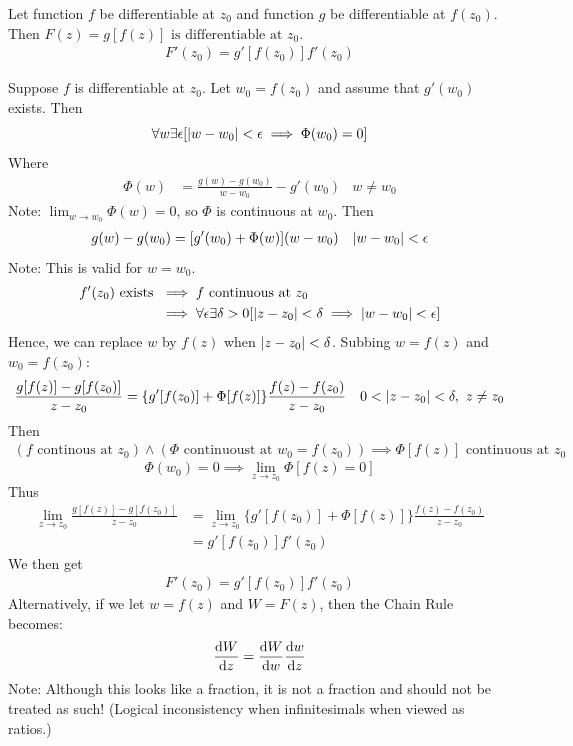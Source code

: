 \documentclass[12pt, english]{book}
\makeatletter
\renewenvironment{proof}[1][\proofname]{\par
	\pushQED{\qed}%
	\normalfont \topsep6\p@\@plus6\p@\relax
	\list{}{%
		\settowidth{\leftmargin}{\itshape\proofname:\hskip\labelsep}%
		\setlength{\labelwidth}{0pt}%
		\setlength{\itemindent}{-\leftmargin}%
	}%
	\item[\hskip\labelsep\itshape#1\@addpunct{:}]\ignorespaces
	}{ \popQED\endlist\@endpefalse}
\makeatother
\begin{document}
	\begin{theorem} 
		\label{Chain Rule for Composite Functions Theorem - Complex}
		Let function $f$ be differentiable at $z_0$ and function $g$ be differentiable at \(f(z_0)\). Then \(F(z) = g[f(z)] \text{ is differentiable at } z_0\).
		\begin{align*}
			F'(z_0) = g'[f(z_0)]f'(z_0) 
		\end{align*}
	\end{theorem}
	\begin{proof}
		Suppose $f$ is differentiable at \(z_0\). Let \(w_0 = f(z_0)\) and assume that \(g'(w_0)\) exists. Then 
		\[ \forall w \exists \epsilon [\abs{w - w_0} < \epsilon \implies \Phi(w_0) = 0 ] \]
		Where 
		\begin{align*}
			\Phi(w) &= \frac{g(w) - g(w_0)}{w - w_0} - g'(w_0) & w \neq w_0
		\end{align*}
		Note: \(\lim_{w \rightarrow w_0} \Phi(w) = 0 \), so \(\Phi\) is continuous at \(w_0\).
		Then 
		\begin{align*}
			g(w) - g(w_0) &= [g'(w_0) + \Phi(w)](w - w_0)	&	 \abs{w-w_0}<\epsilon
		\end{align*}
		Note: This is valid for \(w = w_0\). 
		\begin{align*}
			f'(z_0) \text{ exists } &\implies f \text{ continuous at } z_0 \\
			&\implies \forall \epsilon \exists \delta>0 [ \abs{z - z_0} < \delta \implies \abs{w - w_0}< \epsilon]
		\end{align*}
		Hence, we can replace \(w\) by \(f(z)\) when \(\abs{z - z_0} < \delta\). Subbing \(w = f(z)\) and \(w_0 = f(z_0)\):
		\begin{align*}
			\frac{g[f(z)] - g[f(z_0)]}{z - z_0} &= \{g'[f(z_0)] + \Phi[f(z)]\} \frac{f(z) - f(z_0)}{z - z_0} 	& 0 < \abs{z-z_0} < \delta, \ z\neq z_0
		\end{align*}
		Then
		\begin{align*}
			(f \text{ continous at } z_0) \land (\Phi \text{ continuoust at } w_0 = f(z_0))
			\implies \Phi[f(z)] \text{ continuous at } z_0
		\end{align*}
		\[\Phi(w_0) = 0 \implies \lim_{z \rightarrow z_0} \Phi[f(z) = 0] \]
		Thus
		\begin{align*}
			\lim_{z \rightarrow z_0} \frac{g[f(z)] - g[f(z_0)]}{z - z_0} 
			&= \lim_{z \rightarrow z_0} \{g'[f(z_0)] + \Phi[f(z)]\} \frac{f(z) - f(z_0)}{z - z_0} \\
			&= g'[f(z_0)] f'(z_0)
		\end{align*}
		We then get
		\begin{align*}
			F'(z_0) = g'[f(z_0)]f'(z_0) 
		\end{align*}
	\end{proof}
	Alternatively, if we let \(w = f(z) \) and \(W = F(z)\), then the Chain Rule becomes:
	\[ \dv{W}{z} = \dv{W}{w} \dv{w}{z }\]
	Note: Although this looks like a fraction, it is not a fraction and should not be treated as such! (Logical inconsistency when infinitesimals when viewed as ratios.)
	
\end{document}
